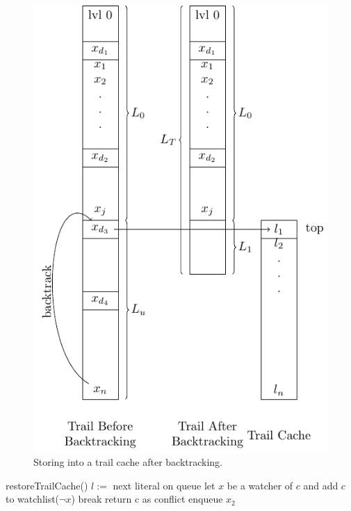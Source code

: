 \documentclass{article}
\begin{document}
\begin{figure}\includegraphics[scale=0.8]{trail_diagram.pdf}\caption{Storing into a trail cache after backtracking.}\end{figure}

	\begin{algorithm}
	\begin{algorithmic}[1]
	\STATE { }
	\STATE restoreTrailCache()
	\STATE { }
	\STATE $l := $ next literal on queue
				\STATE let $x$ be a watcher of $c$ and add $c$ to watchlist($\neg x$)
				\STATE break
			\ENDIF
		\ENDFOR
				\STATE return c as conflict
				\STATE enqueue $x_2$
			\ENDIF
		\ENDIF
	\ENDFOR
	\ENDWHILE
	\end{algorithmic}
	\end{algorithm}
\end{document}
